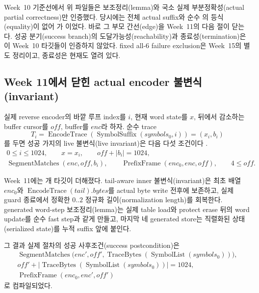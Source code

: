 \begin{caution}
Week~10 기준선에서 위 파일들은 보조정리(lemma)와 국소 실제
부분정확성(actual partial correctness)만 인증했다. 당시에는 전체 actual suffix와
순수 의 등식(equality)이 없어
가 \statuspartial 이었다. 바로 그 부모
간선(edge)을 Week~11의 다음 절이 닫는다. 성공 분기(success branch)의
도달가능성(reachability)과 종료성(termination)은 이 Week~10 타깃들이 인증하지
않았다. fixed all-6 failure exclusion은 Week~15의 별도 정리이고, 종료성은 현재도
열려 있다.
\end{caution}

\subsection{Week 11에서 닫힌 actual encoder 불변식(invariant)}

실제 reverse encoder의 바깥 루프 index를 \(i\), 현재 word state를 \(x\), 뒤에서
감소하는 buffer cursor를 \(off\), buffer를 \(enc\)라 하자. 순수 trace
\[
  T_i=\operatorname{EncodeTrace}
       (\operatorname{SymbolSuffix}(symbols_0,i))=(x_i,b_i)
\]
를 두면 성공 가지의 live 불변식(live invariant)은 다음 다섯 조건이다
\cite{rans-encoder-invariant}.
\[
\begin{gathered}
  0\le i\le1024,\qquad x=x_i,\qquad off+|b_i|=1024,\\
  \operatorname{SegmentMatches}(enc,off,b_i),\qquad
  \operatorname{PrefixFrame}(enc_0,enc,off),\qquad 4\le off.
\end{gathered}
\]

Week~11에는 \WeekElevenTargetCount 개 타깃이 더해졌다. tail-aware inner
불변식(invariant)은 최초 배열 \(enc_0\)와
\(\operatorname{EncodeTrace}(tail).bytes\)를 actual byte write 전후에 보존하고,
실제 guard 종료에서 정확한 \(0..2\) 정규화 길이(normalization length)를
회복한다. generated word-step 보조정리(lemma)는 실제 table load와 protect
erase 뒤의 word update를 순수 fast step과 같게 만들고, 마지막 네 generated
store는 직렬화된 상태(serialized state)를 누적 suffix 앞에 붙인다.

그 결과 실제 절차의 성공 사후조건(success postcondition)은
\[
\begin{gathered}
  \operatorname{SegmentMatches}
  \bigl(enc',off',\operatorname{TraceBytes}
  (\operatorname{SymbolList}(symbols_0))\bigr),\\
  off'+\left|\operatorname{TraceBytes}
  (\operatorname{SymbolList}(symbols_0))\right|=1024,\\
  \operatorname{PrefixFrame}(enc_0,enc',off')
\end{gathered}
\]
로 컴파일되었다.

